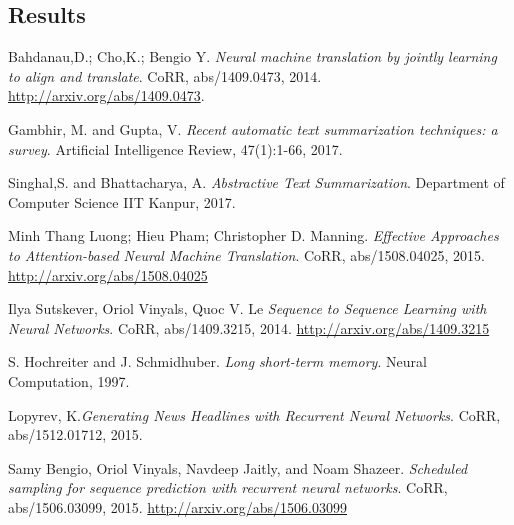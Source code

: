 \subsection{Results}




\begin{thebibliography}{9}
	Bahdanau,D.; Cho,K.; Bengio Y. \textit{Neural machine translation by jointly learning to align and translate}. CoRR, abs/1409.0473, 2014. \url{ http://arxiv.org/abs/1409.0473}.
	
	Gambhir, M. and Gupta, V. \textit{Recent automatic text summarization techniques: a survey}. Artificial Intelligence Review, 47(1):1-66, 2017.
	
	Singhal,S. and Bhattacharya, A. \textit{Abstractive Text Summarization}. Department of Computer Science IIT Kanpur, 2017.
	
	Minh Thang Luong; Hieu Pham; Christopher D. Manning. \textit{Effective Approaches to Attention-based Neural Machine Translation}. CoRR, abs/1508.04025, 2015. \url{http://arxiv.org/abs/1508.04025}
	
	Ilya Sutskever, Oriol Vinyals, Quoc V. Le \textit{Sequence to Sequence Learning with Neural Networks}. CoRR, abs/1409.3215, 2014. \url{http://arxiv.org/abs/1409.3215}
	
	S. Hochreiter and J. Schmidhuber. \textit{Long short-term memory}. Neural Computation, 1997.
		 
	Lopyrev, K.\textit{Generating News Headlines with Recurrent Neural 	Networks}. CoRR, abs/1512.01712, 2015.
	
	Samy Bengio, Oriol Vinyals, Navdeep Jaitly, and Noam Shazeer. \textit{Scheduled sampling for sequence
prediction with recurrent neural networks}. CoRR, abs/1506.03099, 2015. \url{http://arxiv.org/abs/1506.03099}
	
	

\end{thebibliography}


